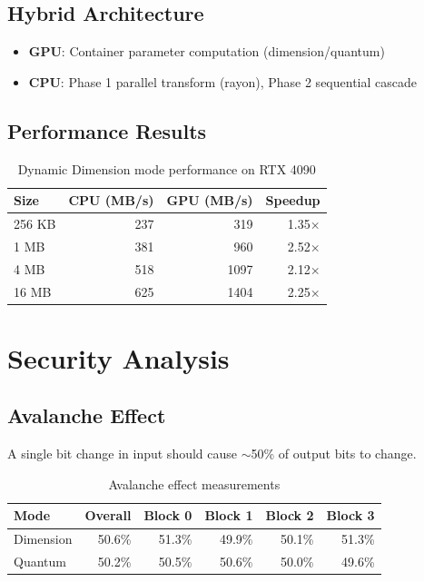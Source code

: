 \documentclass[11pt,a4paper]{article}
\begin{document}
\subsection{Hybrid Architecture}

\begin{itemize}
    \item \textbf{GPU}: Container parameter computation (dimension/quantum)
    \item \textbf{CPU}: Phase 1 parallel transform (rayon), Phase 2 sequential cascade
\end{itemize}

\subsection{Performance Results}

\begin{table}[h]
\centering
\begin{tabular}{lrrr}
\toprule
\textbf{Size} & \textbf{CPU (MB/s)} & \textbf{GPU (MB/s)} & \textbf{Speedup} \\
\midrule
256 KB & 237 & 319 & 1.35$\times$ \\
1 MB & 381 & 960 & 2.52$\times$ \\
4 MB & 518 & 1097 & 2.12$\times$ \\
16 MB & 625 & 1404 & 2.25$\times$ \\
\bottomrule
\end{tabular}
\caption{Dynamic Dimension mode performance on RTX 4090}
\end{table}

\section{Security Analysis}

\subsection{Avalanche Effect}

A single bit change in input should cause $\sim$50\% of output bits to change.

\begin{table}[h]
\centering
\begin{tabular}{lrrrrr}
\toprule
\textbf{Mode} & \textbf{Overall} & \textbf{Block 0} & \textbf{Block 1} & \textbf{Block 2} & \textbf{Block 3} \\
\midrule
Dimension & 50.6\% & 51.3\% & 49.9\% & 50.1\% & 51.3\% \\
Quantum & 50.2\% & 50.5\% & 50.6\% & 50.0\% & 49.6\% \\
\bottomrule
\end{tabular}
\caption{Avalanche effect measurements}
\end{table}
\end{document}
